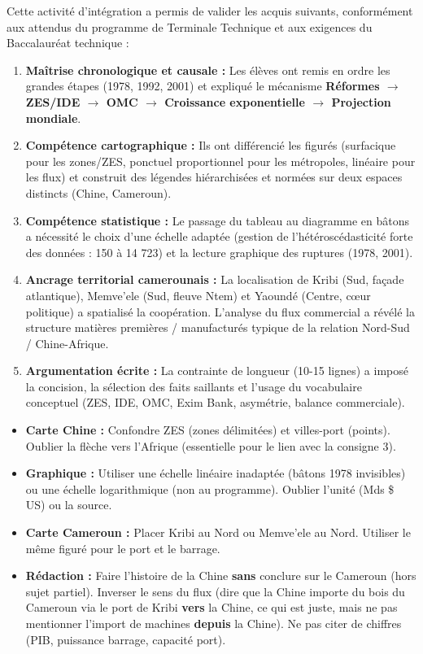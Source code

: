 \documentclass[11pt]{article}
\newcommand{\cle}[1]{{\popxbold\color{popdark}#1}}
\newcounter{popsec}
\newcounter{popsub}
\newcommand{\courssub}[1]{%
  \stepcounter{popsub}%
  \par\vspace{9pt}\noindent{\popxbold\fontsize{11.5}{13}\selectfont\color{popink}{\color{poporange}\thepopsec.\thepopsub}\hspace{6pt}#1}\par\nopagebreak\vspace{4pt}
}
\begin{document}
\courssub{Bilan de l'activité}
Cette activité d'intégration a permis de valider les acquis suivants, conformément aux attendus du programme de Terminale Technique et aux exigences du Baccalauréat technique :
\begin{enumerate}
    \item \textbf{Maîtrise chronologique et causale :} Les élèves ont remis en ordre les grandes étapes (1978, 1992, 2001) et expliqué le mécanisme \textbf{Réformes $\rightarrow$ ZES/IDE $\rightarrow$ OMC $\rightarrow$ Croissance exponentielle $\rightarrow$ Projection mondiale}.
    \item \textbf{Compétence cartographique :} Ils ont différencié les figurés (surfacique pour les zones/ZES, ponctuel proportionnel pour les métropoles, linéaire pour les flux) et construit des légendes hiérarchisées et normées sur deux espaces distincts (Chine, Cameroun).
    \item \textbf{Compétence statistique :} Le passage du tableau au diagramme en bâtons a nécessité le choix d'une échelle adaptée (gestion de l'hétéroscédasticité forte des données : 150 à 14 723) et la lecture graphique des ruptures (1978, 2001).
    \item \textbf{Ancrage territorial camerounais :} La localisation de Kribi (Sud, façade atlantique), Memve'ele (Sud, fleuve Ntem) et Yaoundé (Centre, cœur politique) a spatialisé la coopération. L'analyse du flux commercial a révélé la structure \og matières premières / manufacturés \fg{} typique de la relation Nord-Sud / Chine-Afrique.
    \item \textbf{Argumentation écrite :} La contrainte de longueur (10-15 lignes) a imposé la concision, la sélection des faits saillants et l'usage du vocabulaire conceptuel (\cle{ZES}, \cle{IDE}, \cle{OMC}, \cle{Exim Bank}, \cle{asymétrie}, \cle{balance commerciale}).
\end{enumerate}
\begin{attention}
\begin{itemize}
    \item \textbf{Carte Chine :} Confondre ZES (zones délimitées) et villes-port (points). Oublier la flèche vers l'Afrique (essentielle pour le lien avec la consigne 3).
    \item \textbf{Graphique :} Utiliser une échelle linéaire inadaptée (bâtons 1978 invisibles) ou une échelle logarithmique (non au programme). Oublier l'unité (Mds \$ US) ou la source.
    \item \textbf{Carte Cameroun :} Placer Kribi au Nord ou Memve'ele au Nord. Utiliser le même figuré pour le port et le barrage.
    \item \textbf{Rédaction :} Faire l'histoire de la Chine \textbf{sans} conclure sur le Cameroun (hors sujet partiel). Inverser le sens du flux (dire que la Chine importe du bois du Cameroun via le port de Kribi \textbf{vers} la Chine, ce qui est juste, mais ne pas mentionner l'import de machines \textbf{depuis} la Chine). Ne pas citer de chiffres (PIB, puissance barrage, capacité port).
\end{itemize}
\end{attention}
\end{document}
